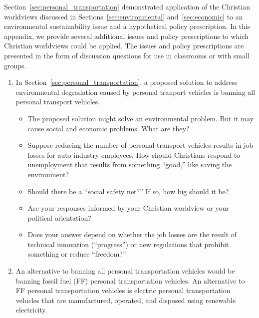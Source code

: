 \documentclass[12pt]{article}
\begin{document}
Section~\ref{sec:personal_transportation} demonstrated application of 
the Christian worldviews discussed in Sections~\ref{sec:environmental} and~\ref{sec:economic}
to an environmental sustainability issue and a hypothetical policy prescription.
In this appendix, we provide several additional issues and policy prescriptions 
to which Christian worldviews could be applied.
The issues and policy prescriptions are presented in the form of discussion questions
for use in classrooms or with small groups.
%
\begin{enumerate}
	
  \item In Section~\ref{sec:personal_transportation}, 
        a proposed solution to address environmental degradation caused by 
        personal tranport vehicles is banning all personal transport vehicles.
		\begin{itemize}

		  \item The proposed solution might solve an environmental problem. 
		        But it may cause social and economic problems. What are they?

		  \item Suppose reducing the number of personal transport vehicles 
		        results in job losses for auto industry employees. 
				How should Christians respond to unemployment that results 
				from something ``good,'' like saving the environment? 

		  \item	Should there be a ``social safety net?'' If so, how big should it be? 
		  
		  \item Are your responses informed by your Christian worldview or your political orientation?  
		  
		  \item Does your answer depend on whether the job losses are the result 
		        of technical innovation (``progress'') or new regulations
				that prohibit something or reduce ``freedom?''
				
		\end{itemize}

  \item An alternative to banning all personal transportation vehicles would be banning 
        fossil fuel (FF) personal transportation vehicles. 
		An alternative to FF personal transportation vehicles is electric personal transportation vehicles
		that are manufactured, operated, and disposed using renewable electricity.  
		

\end{enumerate}
\end{document}
